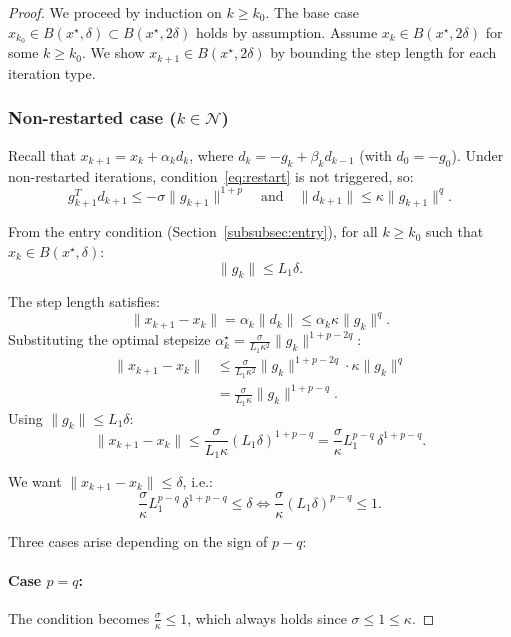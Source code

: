 \documentclass{article}
\begin{document}
\begin{proof}
We proceed by induction on $k \geq k_0$. The base case $x_{k_0} \in B(x^\star, \delta) \subset B(x^\star, 2\delta)$ holds by assumption. Assume $x_k \in B(x^\star, 2\delta)$ for some $k \geq k_0$. We show $x_{k+1} \in B(x^\star, 2\delta)$ by bounding the step length for each iteration type.

\subsubsection{Non-restarted case ($k \in \mathcal{N}$)}

Recall that $x_{k+1} = x_k + \alpha_k d_k$, where $d_k = -g_k + \beta_k d_{k-1}$ (with $d_0 = -g_0$). Under non-restarted iterations, condition~\eqref{eq:restart} is not triggered, so:
\[
g_{k+1}^T d_{k+1} \leq -\sigma\|g_{k+1}\|^{1+p} \quad \text{and} \quad \|d_{k+1}\| \leq \kappa\|g_{k+1}\|^q.
\]

From the entry condition (Section~\ref{subsubsec:entry}), for all $k \geq k_0$ such that $x_k \in B(x^\star, \delta)$:
\[
\|g_k\| \leq L_1\delta.
\]

The step length satisfies:
\[
\|x_{k+1} - x_k\| = \alpha_k\|d_k\| \leq \alpha_k \kappa\|g_k\|^q.
\]
Substituting the optimal stepsize $\alpha_k^\star = \frac{\sigma}{L_1\kappa^2}\|g_k\|^{1+p-2q}$:
\begin{align*}
\|x_{k+1} - x_k\| &\leq \frac{\sigma}{L_1\kappa^2}\|g_k\|^{1+p-2q} \cdot \kappa\|g_k\|^q \\
&= \frac{\sigma}{L_1\kappa}\|g_k\|^{1+p-q}.
\end{align*}
Using $\|g_k\| \leq L_1\delta$:
\begin{equation}
\label{eq:step_NR}
\|x_{k+1} - x_k\| \leq \frac{\sigma}{L_1\kappa}(L_1\delta)^{1+p-q} = \frac{\sigma}{\kappa}L_1^{p-q}\,\delta^{1+p-q}.
\end{equation}

We want $\|x_{k+1} - x_k\| \leq \delta$, i.e.:
\[
\frac{\sigma}{\kappa}L_1^{p-q}\,\delta^{1+p-q} \leq \delta \iff \frac{\sigma}{\kappa}(L_1\delta)^{p-q} \leq 1.
\]

Three cases arise depending on the sign of $p - q$:

\paragraph{Case $p = q$:} The condition becomes $\frac{\sigma}{\kappa} \leq 1$, which always holds since $\sigma \leq 1 \leq \kappa$.


\end{proof}
\end{document}
